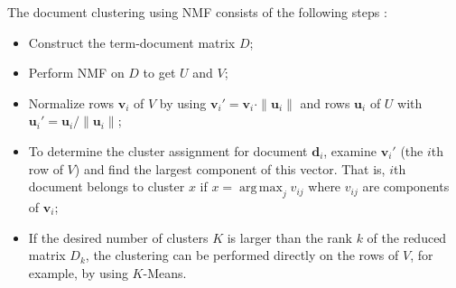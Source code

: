 The document clustering using NMF consists of the following
steps \cite{xu2003document}:

\begin{itemize}
  \item Construct the term-document matrix $D$;
  \item Perform NMF on $D$ to get $U$ and $V$;
  \item Normalize rows $\mathbf v_i$ of $V$ by using $\mathbf v_i' = \mathbf v_i \cdot \| \mathbf u_i \|$ and rows $\mathbf u_i$ of $U$ with $\mathbf u_i' = \mathbf u_i / \| \mathbf u_i \|$;
  \item To determine the cluster assignment for document $\mathbf d_i$, examine $\mathbf v_i'$ (the $i$th row of $V$) and find the largest component of this vector. That is,
      $i$th document belongs to cluster $x$ if $x = \operatorname{arg \, max}_j v_{ij}$ where $v_{ij}$ are components of $\mathbf v_i$;
  \item If the desired number of clusters $K$ is larger than the rank $k$ of the reduced matrix $D_k$, the clustering can be performed directly on the rows of $V$, for example,
      by using $K$-Means.
\end{itemize}

